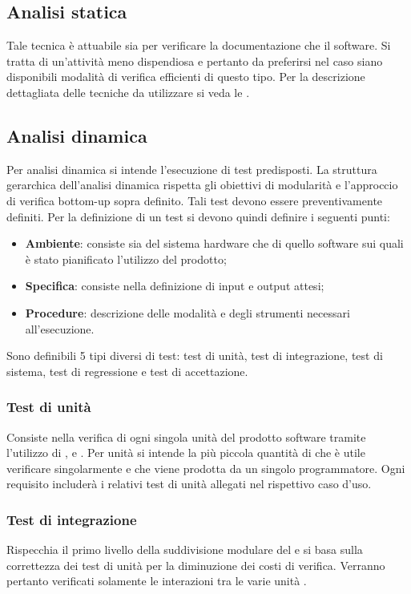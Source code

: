 \documentclass[12pt,a4paper]{article}
\begin{document}
\subsection{Analisi statica}
Tale tecnica è attuabile sia per verificare la documentazione che il software. Si tratta di un'attività meno dispendiosa e pertanto da preferirsi nel caso siano disponibili modalità di verifica efficienti di questo tipo. Per la descrizione dettagliata delle tecniche da utilizzare si veda le \NdP.

\subsection{Analisi dinamica}
Per analisi dinamica si intende l'esecuzione di test predisposti. La struttura gerarchica dell'analisi dinamica rispetta gli obiettivi di modularità e l'approccio di verifica bottom-up sopra definito. Tali test devono essere preventivamente definiti.
Per la definizione di un test si devono quindi definire i seguenti punti:
\begin{itemize}
	\item \textbf{Ambiente}: consiste sia del sistema hardware che di quello software sui quali è stato pianificato l'utilizzo del prodotto;
	\item \textbf{Specifica}: consiste nella definizione di input e output attesi;
	\item \textbf{Procedure}: descrizione delle modalità e degli strumenti necessari all'esecuzione.
\end{itemize}
Sono definibili 5 tipi diversi di test: test di unità, test di integrazione, test di sistema, test di regressione e test di accettazione.

\subsubsection{Test di unità}
Consiste nella verifica di ogni singola unità del prodotto software tramite l'utilizzo di ,  e .
Per unità si intende la più piccola quantità di  che è utile verificare singolarmente e che viene prodotta da un singolo programmatore.
Ogni requisito includerà i relativi test di unità allegati nel rispettivo caso d'uso.

\subsubsection{Test di integrazione}
Rispecchia il primo livello della suddivisione modulare del  e si basa sulla correttezza dei test di unità per la diminuzione dei costi di verifica. Verranno pertanto verificati solamente le interazioni tra le varie unità .
\end{document}
